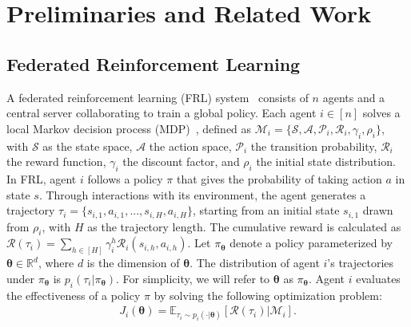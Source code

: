 
\section{Preliminaries and Related Work}



\subsection{Federated Reinforcement Learning}




A federated reinforcement learning (FRL) system~\cite{fan2021fault,khodadadian2022federated,jin2022federated}  consists of $n$ agents and a central server collaborating to train a global policy. Each agent $i \in [n]$ solves a local Markov decision process (MDP)~\cite{sutton2018reinforcement}, defined as $\mathcal{M}_i = \{ \mathcal{S}, \mathcal{A}, \mathcal{P}_i, \mathcal{R}_i, \gamma_i, \rho_i \}$, with $\mathcal{S}$ as the state space, $\mathcal{A}$ the action space, $\mathcal{P}_i$ the transition probability, $\mathcal{R}_i$ the reward function, $\gamma_i$ the discount factor, and $\rho_i$ the initial state distribution.
%
%
In FRL, agent $i$ follows a policy $\pi$ that gives the probability of taking action $a$ in state $s$. Through interactions with its environment, the agent generates a trajectory $\tau_i = \{s_{i,1}, a_{i,1}, ..., s_{i,H}, a_{i,H}\}$, starting from an initial state $s_{i,1}$ drawn from $\rho_i$, with $H$ as the trajectory length. The cumulative reward is calculated as $\mathcal{R}(\tau_i) = \sum_{h \in [H]} \gamma_i^h \mathcal{R}_i(s_{i,h}, a_{i,h})$.
Let $\pi_{\bm{\theta}}$ denote a policy parameterized by $\bm{\theta} \in \mathbb{R}^d$, where $d$ is the dimension of $\bm{\theta}$. The distribution of agent $i$'s trajectories under $\pi_{\bm{\theta}}$ is $p_i(\tau_i | \pi_{\bm{\theta}})$. For simplicity, we will refer to $\bm{\theta}$ as $\pi_{\bm{\theta}}$. Agent $i$ evaluates the effectiveness of a policy $\pi$ by solving the following optimization problem:
\begin{align}
\label{rl_opt}
J_i(\bm{\theta}) = \mathbb{E}_{\tau_i \sim p_i(\cdot | \bm{\theta})}[\mathcal{R}(\tau_i)|\mathcal{M}_i].
\end{align}


